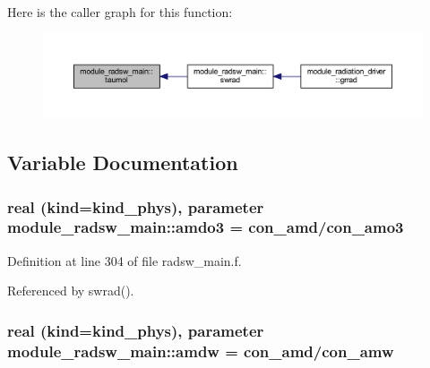 Here is the caller graph for this function\+:
\nopagebreak
\begin{figure}[H]
\begin{center}
\leavevmode
\includegraphics[width=350pt]{namespacemodule__radsw__main_afbfb76d4fab10254e065dce350ae5f2b_icgraph}
\end{center}
\end{figure}




\subsection{Variable Documentation}
\subsubsection[{\texorpdfstring{amdo3}{amdo3}}]{\setlength{\rightskip}{0pt plus 5cm}real (kind=kind\+\_\+phys), parameter module\+\_\+radsw\+\_\+main\+::amdo3 = con\+\_\+amd/con\+\_\+amo3\hspace{0.3cm}{\ttfamily [private]}}\hypertarget{namespacemodule__radsw__main_a527e5e1cec6ad0800f69a606fde77369}{}\label{namespacemodule__radsw__main_a527e5e1cec6ad0800f69a606fde77369}


Definition at line 304 of file radsw\+\_\+main.\+f.



Referenced by swrad().

\subsubsection[{\texorpdfstring{amdw}{amdw}}]{\setlength{\rightskip}{0pt plus 5cm}real (kind=kind\+\_\+phys), parameter module\+\_\+radsw\+\_\+main\+::amdw = con\+\_\+amd/con\+\_\+amw\hspace{0.3cm}{\ttfamily [private]}}\hypertarget{namespacemodule__radsw__main_a1445a63250d89083447371120c484618}{}\label{namespacemodule__radsw__main_a1445a63250d89083447371120c484618}


